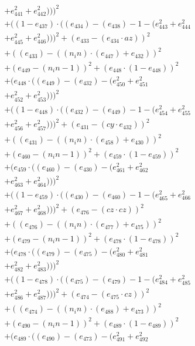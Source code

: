 \documentclass[10pt, a4paper]{article}
\begin{document}
\begin{small}
\begin{align*}
& + e_{441}^{2} + e_{442}^{2})))^{2} \\
& + ((1 - e_{437})  \cdot  ((e_{434}) - (e_{438}) - 1 - (e_{443}^{2} + e_{444}^{2} \\
& + e_{445}^{2} + e_{446}^{2})))^{2} + (e_{433} - (e_{434}  \cdot  az))^{2} \\
& + ((e_{433}) - ((n_in)  \cdot  (e_{447}) + e_{432}))^{2} \\
& + (e_{449} - (n_in - 1))^{2} + (e_{448}  \cdot  (1 - e_{448}))^{2} \\
& + (e_{448}  \cdot  ((e_{449}) - (e_{432}) - (e_{450}^{2} + e_{451}^{2} \\
& + e_{452}^{2} + e_{453}^{2})))^{2} \\
& + ((1 - e_{448})  \cdot  ((e_{432}) - (e_{449}) - 1 - (e_{454}^{2} + e_{455}^{2} \\
& + e_{456}^{2} + e_{457}^{2})))^{2} + (e_{431} - (cy  \cdot  e_{432}))^{2} \\
& + ((e_{431}) - ((n_in)  \cdot  (e_{458}) + e_{430}))^{2} \\
& + (e_{460} - (n_in - 1))^{2} + (e_{459}  \cdot  (1 - e_{459}))^{2} \\
& + (e_{459}  \cdot  ((e_{460}) - (e_{430}) - (e_{461}^{2} + e_{462}^{2} \\
& + e_{463}^{2} + e_{464}^{2})))^{2} \\
& + ((1 - e_{459})  \cdot  ((e_{430}) - (e_{460}) - 1 - (e_{465}^{2} + e_{466}^{2} \\
& + e_{467}^{2} + e_{468}^{2})))^{2} + (e_{476} - (cz  \cdot  cz))^{2} \\
& + ((e_{476}) - ((n_in)  \cdot  (e_{477}) + e_{475}))^{2} \\
& + (e_{479} - (n_in - 1))^{2} + (e_{478}  \cdot  (1 - e_{478}))^{2} \\
& + (e_{478}  \cdot  ((e_{479}) - (e_{475}) - (e_{480}^{2} + e_{481}^{2} \\
& + e_{482}^{2} + e_{483}^{2})))^{2} \\
& + ((1 - e_{478})  \cdot  ((e_{475}) - (e_{479}) - 1 - (e_{484}^{2} + e_{485}^{2} \\
& + e_{486}^{2} + e_{487}^{2})))^{2} + (e_{474} - (e_{475}  \cdot  cz))^{2} \\
& + ((e_{474}) - ((n_in)  \cdot  (e_{488}) + e_{473}))^{2} \\
& + (e_{490} - (n_in - 1))^{2} + (e_{489}  \cdot  (1 - e_{489}))^{2} \\
& + (e_{489}  \cdot  ((e_{490}) - (e_{473}) - (e_{491}^{2} + e_{492}^{2} \\

\end{align*}
\end{small}
\end{document}

